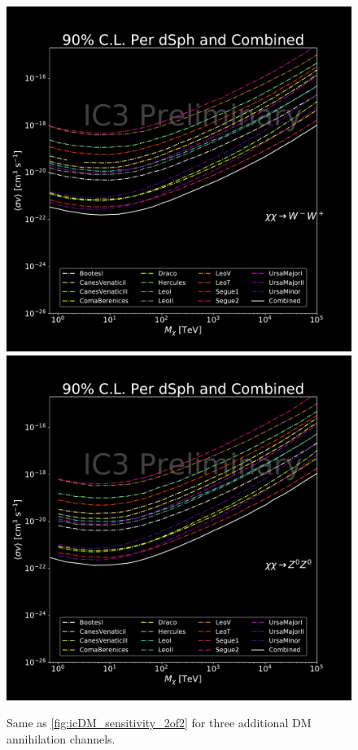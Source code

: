 \begin{figure}
{        \includegraphics[scale=0.265]{figures/ic_DM/dm_plots/WW_money_plot_comb.pdf}
        \includegraphics[scale=0.265]{figures/ic_DM/dm_plots/ZZ_money_plot_comb.pdf}
    }
    \caption{Same as \cref{fig:icDM_sensitivity_2of2} for three additional DM annihilation channels.}
    \label{fig:icDM_sensitivity_1of2}
\end{figure}


